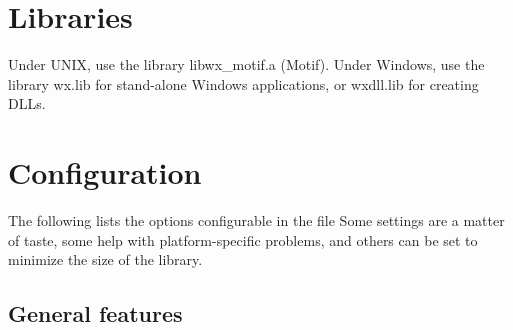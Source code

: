\section{Libraries}

Under UNIX, use the library libwx\_motif.a
(Motif).  Under Windows, use the library wx.lib for stand-alone Windows
applications, or wxdll.lib for creating DLLs.

\section{Configuration}

The following lists the options configurable in the file
 Some settings are a matter
of taste, some help with platform-specific problems, and
others can be set to minimize the size of the library.

\subsection{General features}

